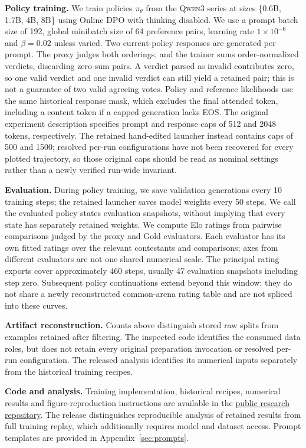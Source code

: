 \documentclass[11pt,letterpaper]{article}
\begin{document}
\textbf{Policy training.} We train policies $\pi_\theta$ from the \textsc{Qwen3} series at sizes \{0.6B, 1.7B, 4B, 8B\} using Online DPO with thinking disabled. We use a prompt batch size of 192, global minibatch size of 64 preference pairs, learning rate $1 \times 10^{-6}$ and $\beta = 0.02$ unless varied. Two current-policy responses are generated per prompt. The proxy judges both orderings, and the trainer sums order-normalized verdicts, discarding zero-sum pairs. A verdict parsed as invalid contributes zero, so one valid verdict and one invalid verdict can still yield a retained pair; this is not a guarantee of two valid agreeing votes. Policy and reference likelihoods use the same historical response mask, which excludes the final attended token, including a content token if a capped generation lacks EOS. The original experiment description specifies prompt and response caps of 512 and 2048 tokens, respectively. The retained hand-edited launcher instead contains caps of 500 and 1500; resolved per-run configurations have not been recovered for every plotted trajectory, so those original caps should be read as nominal settings rather than a newly verified run-wide invariant.

\textbf{Evaluation.} During policy training, we save validation generations every 10 training steps; the retained launcher saves model weights every 50 steps. We call the evaluated policy states evaluation snapshots, without implying that every state has separately retained weights. We compute Elo ratings from pairwise comparisons judged by the proxy and Gold evaluators. Each evaluator has its own fitted ratings over the relevant contestants and comparisons; axes from different evaluators are not one shared numerical scale. The principal rating exports cover approximately 460 steps, usually 47 evaluation snapshots including step zero. Subsequent policy continuations extend beyond this window; they do not share a newly reconstructed common-arena rating table and are not spliced into these curves.

\textbf{Artifact reconstruction.} Counts above distinguish stored raw splits from examples retained after filtering. The inspected code identifies the consumed data roles, but does not retain every original preparation invocation or resolved per-run configuration. The released analysis identifies its numerical inputs separately from the historical training recipes.

\textbf{Code and analysis.} Training implementation, historical recipes, numerical results and figure-reproduction instructions are available in the \href{https://github.com/RaychevAngel/generative-reward-models}{public research repository}. The release distinguishes reproducible analysis of retained results from full training replay, which additionally requires model and dataset access. Prompt templates are provided in Appendix~\ref{sec:prompts}.
\end{document}
